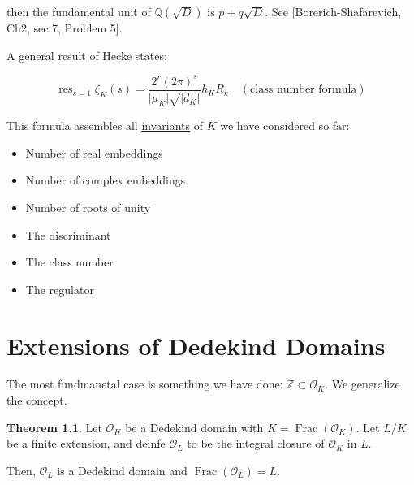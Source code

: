 \documentclass[openany]{amsbook}
\numberwithin{section}{chapter}
\theoremstyle{definition}
\newtheorem{theorem}{Theorem}[chapter]
\newcommand{\Frac}{\operatorname{Frac}}
\begin{document}
then the fundamental unit of \(\mathbb{Q}(\sqrt{D})\) is \(p + q \sqrt{D}\). See [Borerich-Shafarevich, Ch2, sec 7, Problem 5].

A general result of Hecke states:

\[
    \operatorname{res}_{s=1} \zeta_K (s) = \frac{2^r (2\pi)^s}{\vert \mu_K \vert \sqrt{\vert d_K \vert}} h_K R_k \quad (\text{class number formula})
\]

This formula assembles all \underline{invariants} of \(K\) we have considered so far:

\begin{itemize}
    \item Number of real embeddings
    \item Number of complex embeddings
    \item Number of roots of unity
    \item The discriminant
    \item The class number
    \item The regulator 
\end{itemize} 

\chapter{Extensions of Dedekind Domains}

The most fundmanetal case is something we have done: \(\mathbb{Z} \subset \mathcal{O}_K\). We generalize the concept.

\begin{theorem}
    Let \(\mathcal{O}_K\) be a Dedekind domain with \(K = \Frac(\mathcal{O}_K)\). Let \(L / K\) be a finite extension, and deinfe \(\mathcal{O}_L\) to be the integral closure of \(\mathcal{O}_K\) in \(L\).

    Then, \(\mathcal{O}_L\) is a Dedekind domain and \(\Frac(\mathcal{O}_L) = L\).
\end{theorem}
\end{document}
